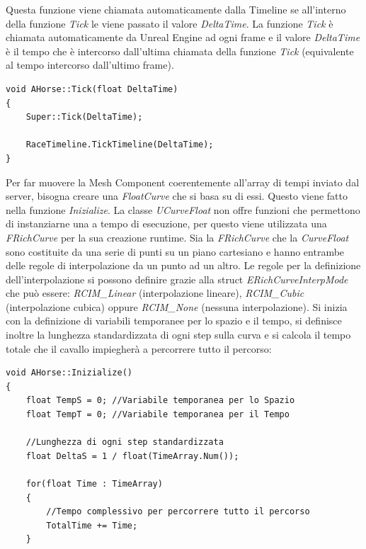         Questa funzione viene chiamata automaticamente dalla Timeline se all'interno della funzione \textit{Tick} le viene passato il valore \textit{DeltaTime}.
        La funzione \textit{Tick} è chiamata automaticamente da Unreal Engine ad ogni frame e il valore \textit{DeltaTime} è il tempo che è intercorso dall'ultima chiamata della funzione \textit{Tick} (equivalente al tempo intercorso dall'ultimo frame).

        \begin{lstlisting}[caption = Funzione Tick (movimento cavallo)]
void AHorse::Tick(float DeltaTime)
{
    Super::Tick(DeltaTime);

    RaceTimeline.TickTimeline(DeltaTime);
}
        \end{lstlisting}

        Per far muovere la Mesh Component coerentemente all'array di tempi inviato dal server, bisogna creare una \textit{FloatCurve} che si basa su di essi.
        Questo viene fatto nella funzione \textit{Inizialize}.
        La classe \textit{UCurveFloat} non offre funzioni che permettono di instanziarne una a tempo di esecuzione, per questo viene utilizzata una \textit{FRichCurve} per la sua creazione runtime.
        Sia la \textit{FRichCurve} che la \textit{CurveFloat} sono costituite da una serie di punti su un piano cartesiano e hanno entrambe delle regole di interpolazione da un punto ad un altro.
        Le regole per la definizione dell'interpolazione si possono definire grazie alla struct \textit{ERichCurveInterpMode} che può essere: \textit{RCIM\_Linear} (interpolazione lineare), \textit{RCIM\_Cubic} (interpolazione cubica) oppure \textit{RCIM\_None} (nessuna interpolazione).
        Si inizia con la definizione di variabili temporanee per lo spazio e il tempo, si definisce inoltre la lunghezza standardizzata di ogni step sulla curva e si calcola il tempo totale che il cavallo impiegherà a percorrere tutto il percorso:

        \begin{lstlisting}[caption = Definizione variabili temporanee (movimento cavallo)]
void AHorse::Inizialize()
{
    float TempS = 0; //Variabile temporanea per lo Spazio
    float TempT = 0; //Variabile temporanea per il Tempo
    
    //Lunghezza di ogni step standardizzata 
    float DeltaS = 1 / float(TimeArray.Num());
    
    for(float Time : TimeArray)
    {
        //Tempo complessivo per percorrere tutto il percorso
        TotalTime += Time;
    }
        \end{lstlisting}

